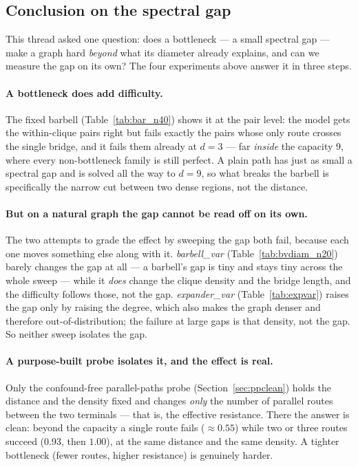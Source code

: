 \documentclass[11pt,a4paper]{article}
\begin{document}
\subsection{Conclusion on the spectral gap}
\label{sec:gap-conclusion}

This thread asked one question: does a bottleneck --- a small spectral gap --- make a graph hard
\emph{beyond} what its diameter already explains, and can we measure the gap on its own? The four
experiments above answer it in three steps.

\paragraph{A bottleneck does add difficulty.} The fixed barbell (Table~\ref{tab:bar_n40}) shows it
at the pair level: the model gets the within-clique pairs right but fails exactly the pairs whose
only route crosses the single bridge, and it fails them already at $d=3$ --- far \emph{inside} the
capacity $9$, where every non-bottleneck family is still perfect. A plain path has just as small a
spectral gap and is solved all the way to $d=9$, so what breaks the barbell is specifically the
narrow cut between two dense regions, not the distance.

\paragraph{But on a natural graph the gap cannot be read off on its own.} The two attempts to
grade the effect by sweeping the gap both fail, because each one moves something else along with
it. \emph{barbell\_var} (Table~\ref{tab:bvdiam_n20}) barely changes the gap at all --- a barbell's
gap is tiny and stays tiny across the whole sweep --- while it \emph{does} change the clique
density and the bridge length, and the difficulty follows those, not the gap. \emph{expander\_var}
(Table~\ref{tab:expvar}) raises the gap only by raising the degree, which also makes the graph
denser and therefore out-of-distribution; the failure at large gaps is that density, not the gap.
So neither sweep isolates the gap.

\paragraph{A purpose-built probe isolates it, and the effect is real.} Only the confound-free
parallel-paths probe (Section~\ref{sec:ppclean}) holds the distance and the density fixed and
changes \emph{only} the number of parallel routes between the two terminals --- that is, the
effective resistance. There the answer is clean: beyond the capacity a single route fails
($\approx0.55$) while two or three routes succeed ($0.93$, then $1.00$), at the same distance and
the same density. A tighter bottleneck (fewer routes, higher resistance) is genuinely harder.
\end{document}
